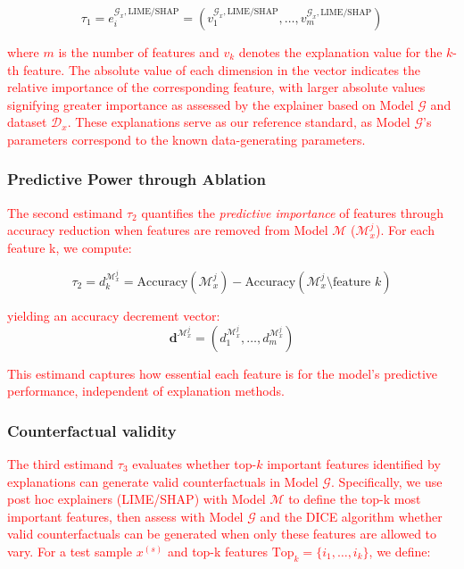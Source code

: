 \begin{equation}
    \tau_1 = e_{i}^{\mathcal{G}_x,\text{LIME/SHAP}} = (v_{1}^{\mathcal{G}_x,\text{LIME/SHAP}}, \ldots, v_{m}^{\mathcal{G}_x,\text{LIME/SHAP}})
\end{equation}

\textcolor{red}{where $m$ is the number of features and $v_k$ denotes the explanation value for the $k$-th feature. The absolute value of each dimension in the vector indicates the relative importance of the corresponding feature, with larger absolute values signifying greater importance as assessed by the explainer based on Model $\mathcal{G}$ and dataset $\mathcal{D}_x$. These explanations serve as our reference standard, as Model $\mathcal{G}$'s parameters correspond to the known data-generating parameters.}

\subsubsection*{Predictive Power through Ablation}
\textcolor{red}{The second estimand $\tau_2$ quantifies the \textit{predictive importance} of features through accuracy reduction when features are removed from Model $\mathcal{M}$ ($\mathcal{M}_x^j$). For each feature k, we compute:}

\begin{equation}
    \tau_2 = d_k^{\mathcal{M}_x^j} = \text{Accuracy}(\mathcal{M}_x^j) - \text{Accuracy}(\mathcal{M}_x^j \setminus \text{feature } k)
\end{equation}

\textcolor{red}{yielding an accuracy decrement vector:}
\begin{equation}
    \mathbf{d}^{\mathcal{M}_x^j} = (d_1^{\mathcal{M}_x^j}, \ldots, d_m^{\mathcal{M}_x^j})
\label{equation:accuracy decrements}
\end{equation}

\textcolor{red}{This estimand captures how essential each feature is for the model's predictive performance, independent of explanation methods.}

\subsubsection*{Counterfactual validity}
\textcolor{red}{The third estimand $\tau_3$ evaluates whether top-$k$ important features identified by explanations can generate valid counterfactuals in Model $\mathcal{G}$. Specifically, we use post hoc explainers (LIME/SHAP) with Model $\mathcal{M}$ to define the top-k most important features, then assess with Model $\mathcal{G}$ and the DICE algorithm whether valid counterfactuals can be generated when only these features are allowed to vary. For a test sample $x^{(s)}$ and top-k features $\text{Top}_k = \{i_1,\ldots,i_k\}$, we define:}

